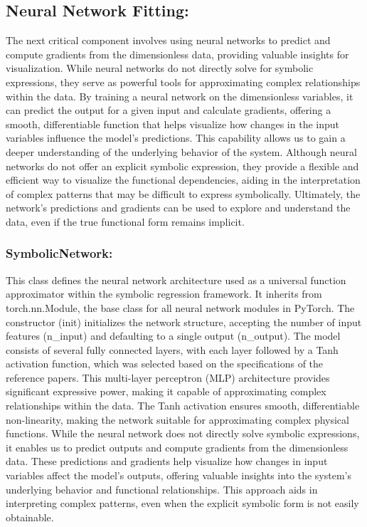\documentclass{article}
\begin{document}
\subsection{Neural Network Fitting: }


The next critical component involves using neural networks to predict and compute gradients from the dimensionless data, providing valuable insights for visualization. While neural networks do not directly solve for symbolic expressions, they serve as powerful tools for approximating complex relationships within the data. By training a neural network on the dimensionless variables, it can predict the output for a given input and calculate gradients, offering a smooth, differentiable function that helps visualize how changes in the input variables influence the model’s predictions. This capability allows us to gain a deeper understanding of the underlying behavior of the system. Although neural networks do not offer an explicit symbolic expression, they provide a flexible and efficient way to visualize the functional dependencies, aiding in the interpretation of complex patterns that may be difficult to express symbolically. Ultimately, the network's predictions and gradients can be used to explore and understand the data, even if the true functional form remains implicit.\\







\subsubsection{SymbolicNetwork:}


This class defines the neural network architecture used as a universal function approximator within the symbolic regression framework. It inherits from torch.nn.Module, the base class for all neural network modules in PyTorch. The constructor (init) initializes the network structure, accepting the number of input features (n\_input) and defaulting to a single output (n\_output). The model consists of several fully connected layers, with each layer followed by a Tanh activation function, which was selected based on the specifications of the reference papers. This multi-layer perceptron (MLP) architecture provides significant expressive power, making it capable of approximating complex relationships within the data. The Tanh activation ensures smooth, differentiable non-linearity, making the network suitable for approximating complex physical functions. While the neural network does not directly solve symbolic expressions, it enables us to predict outputs and compute gradients from the dimensionless data. These predictions and gradients help visualize how changes in input variables affect the model's outputs, offering valuable insights into the system's underlying behavior and functional relationships. This approach aids in interpreting complex patterns, even when the explicit symbolic form is not easily obtainable.\\
\end{document}
